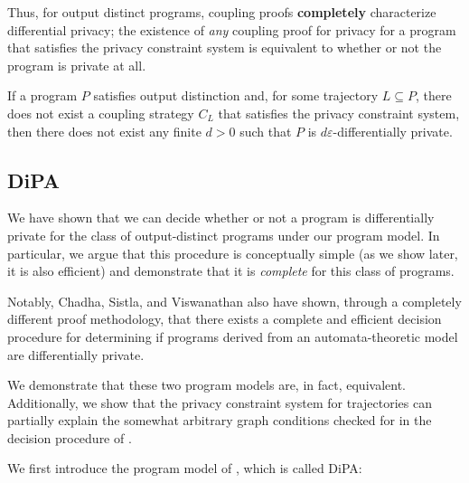 Thus, for output distinct programs, coupling proofs \textbf{completely} characterize differential privacy; the existence of \textit{any} coupling proof for privacy for a program that satisfies the privacy constraint system is equivalent to whether or not the program is private at all.

\begin{thm}\label{ProgramCounterexampleThm}
    If a program $P$ satisfies output distinction and, for some trajectory $L\subseteq P$, there does not exist a coupling strategy $C_L$ that satisfies the privacy constraint system, then there does not exist any finite $d>0$ such that $P$ is $d\varepsilon$-differentially private.
\end{thm}

\subsection{DiPA}

We have shown that we can decide whether or not a program is differentially private for the class of output-distinct programs under our program model. In particular, we argue that this procedure is conceptually simple (as we show later, it is also efficient) and demonstrate that it is \textit{complete} for this class of programs.

Notably, Chadha, Sistla, and Viswanathan \cite{chadhaLinearTimeDecidability2021} also have shown, through a completely different proof methodology, that there exists a complete and efficient decision procedure for determining if programs derived from an automata-theoretic model are differentially private. 

We demonstrate that these two program models are, in fact, equivalent. Additionally, we show that the privacy constraint system for trajectories can partially explain the somewhat arbitrary graph conditions checked for in the decision procedure of \cite{chadhaLinearTimeDecidability2021}.

We first introduce the program model of \cite{chadhaLinearTimeDecidability2021}, which is called DiPA:

